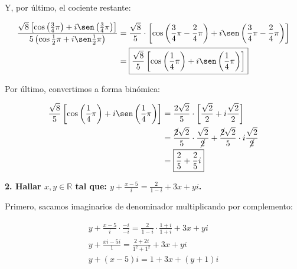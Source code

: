 \documentclass[12pt]{article}
\begin{document}
Y, por último, el cociente restante:

\begin{align*}
    \frac{\sqrt{8} \left[\cos \left(\frac{3}{4}\pi\right) + i \sen \left(\frac{3}{4}\pi\right)\right]}{5\left(\cos \frac{1}{2}\pi + i \sen \frac{1}{2} \pi\right)} & = \frac{\sqrt{8}}{5} \cdot \left[\cos \left(\frac{3}{4}\pi - \frac{2}{4}\pi\right) + i \sen \left(\frac{3}{4}\pi - \frac{2}{4}\pi\right)\right] \\
                                                                                                                                                                   & = \boxed{\frac{\sqrt{8}}{5} \left[\cos \left(\frac{1}{4}\pi\right) + i \sen \left(\frac{1}{4}\pi\right)\right]}                                 \\
\end{align*}

Por último, convertimos a forma binómica:

\begin{align*}
    \frac{\sqrt{8}}{5} \left[\cos \left(\frac{1}{4}\pi\right) + i \sen \left(\frac{1}{4}\pi\right)\right] & = \frac{2\sqrt{2}}{5} \cdot \left[\frac{\sqrt{2}}{2} + i \frac{\sqrt{2}}{2}\right]                                                  \\
                                                                                                          & = \frac{\cancel{2}\sqrt{2}}{5} \cdot \frac{\sqrt{2}}{\cancel{2}} + \frac{\cancel{2}\sqrt{2}}{5} \cdot i \frac{\sqrt{2}}{\cancel{2}} \\
                                                                                                          & = \boxed{\frac{2}{5} + \frac{2}{5}i}
\end{align*}

\textbf{2. Hallar \(x, y \in \mathbb{R}\) tal que: \(y + \frac{x-5}{i} = \frac{2}{1-i} + 3x + yi\).}

Primero, sacamos imaginarios de denominador multiplicando por complemento:

\begin{align*}
    y + \frac{x-5}{i} \cdot \frac{-i}{-i} = \frac{2}{1-i} \cdot \frac{1+i}{1+i} + 3x + yi \\
    y + \frac{xi - 5i}{1} = \frac{2+2i}{1^2 + 1^2} + 3x + yi                              \\
    y + (x-5)i = 1 + 3x + (y+1)i                                                          \\
\end{align*}
\end{document}
